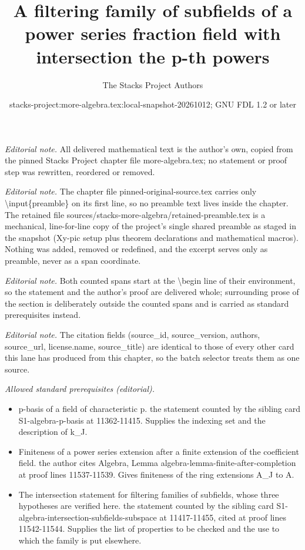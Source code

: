 \documentclass[10pt,a4paper]{amsart}
\title{A filtering family of subfields of a power series fraction field with intersection the p-th powers}
\author{The Stacks Project Authors}
\date{stacks-project:more-algebra.tex:local-snapshot-20261012; GNU FDL 1.2 or later}
\theoremstyle{plain}
\theoremstyle{definition}
\theoremstyle{remark}
\numberwithin{equation}{subsection}
\begin{document}
\maketitle
\setcounter{subsection}{1}
\noindent\textit{Editorial note.} All delivered mathematical text is the author's own, copied from the pinned Stacks Project chapter file more-algebra.tex; no statement or proof step was rewritten, reordered or removed.\par\medskip
\noindent\textit{Editorial note.} The chapter file pinned-original-source.tex carries only \textbackslash{}input\{preamble\} on its first line, so no preamble text lives inside the chapter. The retained file sources/stacks-more-algebra/retained-preamble.tex is a mechanical, line-for-line copy of the project's single shared preamble as staged in the snapshot (Xy-pic setup plus theorem declarations and mathematical macros). Nothing was added, removed or redefined, and the excerpt serves only as preamble, never as a span coordinate.\par\medskip
\noindent\textit{Editorial note.} Both counted spans start at the \textbackslash{}begin line of their environment, so the statement and the author's proof are delivered whole; surrounding prose of the section is deliberately outside the counted spans and is carried as standard prerequisites instead.\par\medskip
\noindent\textit{Editorial note.} The citation fields (source\_id, source\_version, authors, source\_url, license.name, source\_title) are identical to those of every other card this lane has produced from this chapter, so the batch selector treats them as one source.\par\medskip
\noindent\textit{Allowed standard prerequisites (editorial).}\begin{itemize}
\item p-basis of a field of characteristic p. the statement counted by the sibling card S1-algebra-p-basis at 11362-11415. Supplies the indexing set and the description of k\_J.
\item Finiteness of a power series extension after a finite extension of the coefficient field. the author cites Algebra, Lemma algebra-lemma-finite-after-completion at proof lines 11537-11539. Gives finiteness of the ring extensions A\_J to A.
\item The intersection statement for filtering families of subfields, whose three hypotheses are verified here. the statement counted by the sibling card S1-algebra-intersection-subfields-subspace at 11417-11455, cited at proof lines 11542-11544. Supplies the list of properties to be checked and the use to which the family is put elsewhere.
\end{itemize}\medskip
\end{document}
